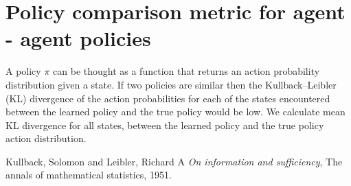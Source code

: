 \documentclass[12pt]{article}
\begin{document}
\section{Policy comparison metric for agent - agent policies}
A policy $\pi$ can be thought as a function that returns an action probability distribution given a state.
If two policies are similar then the Kullback–Leibler (KL) \cite{kullback1951information} divergence of the action probabilities for each of the states encountered between the learned policy and the true policy would be low. We calculate mean KL divergence for all states, between the learned policy and the true policy action distribution. 

\begin{thebibliography}{1}

   Kullback, Solomon and Leibler, Richard A {\em On information and sufficiency}, The annals of mathematical statistics,  1951.
 
\end{thebibliography}
  
\end{document}
